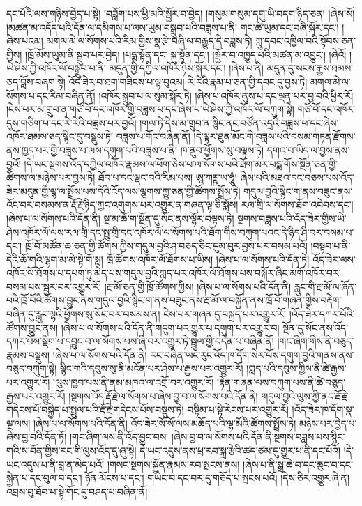 དང་པོའི་ལས་གཉིས་བྱེད་པ་སྟེ། །བཟློག་པས་ཕྱི་མའི་སྦྱོར་བ་བྱེད། །གསུམ་གསུམ་དགུ་ཡི་བདག་ཉིད་ཅན། །ཞེས་སོ། །མཚན་མ་འདོད་པའི་དོན་ལ་དམིགས་པ་ལས་ཡུམ་བསྒྲུབ་པའི་བཟླས་པ་ནི། གང་ཚེ་ཡུམ་དང་བཞི་སྐོར་དང་། །ཞེས་པའམ། མགལ་མེ་ལ་སོགས་པའི་རིམ་གྱིས་སྣ་རྩེ་བཞི་ལ་བརྒྱུད་དེ་བཟླས་ཏེ། ཀླུ་དབང་འཁྱིལ་བའི་སྟོབས་ཅན་གྱིས། །ཁྲོ་མོས་ཡུམ་ནི་སྒྲུབ་པར་བྱེད། །པདྨ་སྟོན་དང་​ སྐུ་སྟོན་དང་། །སྦྱོར་བ་འཁྱུད་པའི་མཚན་མ་འབྱུང་། །ཞེའོ། །ཡེ་ཤེས་ཀྱི་འཁོར་ལོ་བསྒྲུབ་པ་ནི། མདུན་གྱི་དཀྱིལ་འཁོར་ཉིས་སྐོར་དང་། །ཞེས་པ་ནི། མདུན་དུ་སངས་རྒྱས་ཐམས་ཅད་བློས་བཞག་སྟེ། འོད་ཟེར་བ་ཐག་གཟིངས་པ་ལྟ་བུའམ། རེ་རེའི་རྣམ་པ་ཅན་གྱི་དབང་དུ་བྱས་ཏེ། མགལ་མེ་ལ་སོགས་པ་དང་རིམ་བཞིན་ནོ། །འཁོར་སྒྲུབ་པ་ལ་སུམ་སྐོར་ཏེ། །ཞེས་པ་འཁོར་ནུས་པ་དང་ལྡན་པར་བྱ་བའི་ཕྱིར་རོ། །ངེས་པར་མ་གྲུབ་ན་གཙོ་བོ་དང་འཁོར་གྱི་བཟླས་པ་དང་ཞེས་པ་ཡེ་ཤེས་ཀྱི་འཁོར་ལོ་བཀུག་སྟེ། གཙོ་བོ་དང་འཁོར་དུས་གཅིག་པ་དང་རེ་རེའི་བཟླས་པར་བྱའོ། །གལ་ཏེ་དེས་མ་གྲུབ་ན་སྙིང་ནང་བཙོན་འདྲའི་བཟླས་པ་དང་ཞེས་འཁོར་ཐམས་ཅད་སྙིང་དུ་བསྡུས་ཏེ། བཟླས་པ་གོང་བཞིན་ནོ། །དེ་ལྟར་ཐུན་མོང་གི་བཟླས་པའི་བསམ་གཏན་རྫོགས་ནས་ཁྱད་པར་གྱི་བཟླས་པ་ལས་དགུག་པའི་བཟླས་པ་ནི། ཁ་ནུབ་ཕྱོགས་སུ་བལྟས་ཏེ། དགའ་བ་ཡིད་ལ་བྱས་ནས་བྱའོ། །དེ་ཡང་སྔགས་འོད་དཀྱིལ་འཁོར་རྣམས་ལ་ཕོག་ཅེས་པ་ལ་སོགས་པའི་ཐོག་མར་པདྨ་གོས་སྔོན་ཅན་གྱི་ཚོགས་ལ་མཉེས་པར་བྱས་ཏེ། ཐོབ་པ་དང་ལྡང་བའི་རིམ་པས། ཨཱ་ཀཪྵ་ཡ་ཧཱུཾ། ཞེས་པའི་མཐའ་དང་བཅས་པས་འོད་ཟེར་མདུན་གྱི་ལྷ་ལ་སྤྲོས་པས་དེའི་འོད་ལས་ལྕགས་ཀྱུ་ཅན་གྱི་ཚོགས་སྤྲོས་ཏེ། གདུལ་བྱའི་སྙིང་ག་ནས་བཟུང་ནས་འོང་བར་བསམས་ན་རྡོ་རྗེ་ཉིད་ཀྱང་འགུགས་པར་འགྱུར་ན་གཞན་ལྟ་ཅི་སྨོས། རལ་གྲི་ལ་སོགས་ཐོག་འབེབས་དང་། །ཞེས་པ་ལ་སོགས་པའི་དོན་ནི། སྔ་མ་ཆོ་ག་སྔོན་དུ་སོང་ནས་ལྷོར་བལྟས་ཏེ། སྔགས་བཟླས་པའི་འོད་ཟེར་གྱིས་ཡེ་ཤེས་འཁོར་ལོ་ལས་རལ་གྲི་དང་སྤུ་གྲི་དང་འཁོར་ལོ་ལ་སོགས་པའི་ཐོག་གིས་བཀུག་པའང་དེ་ཉིད་ཤི་བར་བསམ་པ་དང་། ཁྲོ་བོ་མཚོན་ཆ་ཅན་གྱི་ཚོགས་ཀྱིས་གདུལ་བྱའི་ཤ་བཅད་ཅིང་དུམ་བུར་བྱས་པར་བསམ་པའོ། །བསྟབ་པ་ནི་དེའི་ཆོ་གའི་ལྷག་མ་མེ་སྟེ་གོ་སླ། ཁྲོ་ཚོགས་འཁོར་ལོ་ཐོགས་པ་ཡིས། །ཞེས་པ་ལ་སོགས་པའི་དོན་ཏེ། འོད་ཟེར་ལས་འཁོར་ལོ་ཐོགས་པ་དཔག་ཏུ་མེད་པས་གདུལ་བྱའི་ཀླད་པར་​ འཁོར་ལོ་ཐོགས་པས་བསྐོར་ཞིང་མགོ་འཁོར་བར་བསམ་པས་སྦྱར་བར་འགྱུར་རོ། །རྔ་མོ་ཅན་གྱི་ཁྲོ་ཚོགས་ཀྱིས། །ཞེས་པ་ལ་སོགས་པའི་དོན་ནི། རླུང་གི་རྔ་མོ་ལ་ཞོན་པའི་ཁྲོ་བོའི་ཚོགས་བྱུང་ནས་གདུལ་བྱའི་སྙིང་ག་ནས་བཟུང་ནས་རྔ་མོ་ལ་བསྐྱོན་ནས་ཁྲོ་བོ་གཞན་གྱིས་བརྡེག་བཞིན་དུ་རླུང་ལྷའི་ཕྱོགས་སུ་སོང་བར་བསམས་ན། ངེས་པར་གཞན་དུ་བསྐྲད་པར་འགྱུར་རོ། །འོད་ཟེར་དཀར་པོའི་ཚོགས་བྱུང་ནས། །ཞེས་པ་ལ་སོགས་པའི་དོན་ནི་གདུག་པར་གྱུར་པ་དགུག་པར་འགྱུར་བ། སྔོན་དུ་སོང་ནས་འོད་དཀར་པོས་སྡིག་པ་དབྱུང་བ་ལ་སོགས་པས་ཞི་བར་འགྱུར་ཏེ་སྦྲུལ་གྱི་བདེན་པ་བཞིན་ནོ། །གང་ཞིག་གིས་ནི་བཅུད་རྣམས་བསྡུས། །ཞེས་པ་ལ་སོགས་པའི་དོན་ནི། རང་བཞིན་ཡང་རུང་འོད་ཁ་དོག་སེར་པོས་དགུག་བྱའི་གནས་ནས་བཅུད་བཀུག་སྟེ། སྙིང་གའི་དབུས་སུ་ནི་མངོན་པར་ཤེས་པ་རྒྱས་པར་འགྱུར་རོ། །ཀླད་པའི་དབུས་ཀྱིས་ནི་ཚེ་རྒྱས་པར་འགྱུར་རོ། །ལུས་ཁྱབ་པས་ནི་ནམ་མཁའ་ལ་འགྲོ་བར་འགྱུར་རོ། །རྟེན་གཞན་ལས་བཀུག་པས་ནི་ཚེ་བཅུད་རྒྱས་པར་འགྱུར་རོ། །སྔགས་འོད་རྡོ་རྗེ་ལ་སོགས་པ་ཞེས་བྱ་བ་ལ་སོགས་པའི་དོན་ནི། གདུལ་བྱའི་ལུས་ཀྱི་ནང་རྡོ་རྗེ་གདེངས་པོ་བསྐྱེད་པ་སྤྲུལ་པའི་རྡོ་རྗེ་གདེངས་པོས་བསྡུས་ཏེ། བསྟིམ་པ་སྟེ་རེངས་པར་འགྱུར་རོ། །འོད་ཟེར་ཁ་དོག་སྣ་ལྔ་ལས། །ཞེས་པ་ལ་སོགས་པའི་དོན་ནི། འོད་ཟེར་སོ་སོ་ལས་མཆོད་པའི་ལྷ་མོའི་ཚོགས་སྤྲོས་ཏེ། མཉེས་པར་བྱེད་པ་ཞེས་བྱ་བའི་དོན་ཏོ། །གང་ཞིག་ལས་ནི་འོད་བྱུང་བས། །ཞེས་བྱ་བ་ལ་སོགས་པའི་དོན་ནི་སྔགས་བཟླས་པས་སྙིང་གའི་ས་བོན་གྱིས་རང་གི་ལུས་འོད་དུ་ཞུ་སྟེ། དེ་ཡང་འདུས་ནས་ཕྲ་རབ་སྐྲ་རྩེའི་ཚད་ཙམ་དུ་གྱུར་པ་ནི་དང་པོའོ། །དེ་ཡང་འདུས་པ་ནི་བླ་ན་མེད་པའོ། །གསང་སྔགས་སྐྱོན་རྣམས་རབ་སྤངས་ནས། །ཞེས་པ་ནི་སྒྲ་ཆེ་བ་དང་ཆུང་བ་དང་སྐྱེན་པ་དང་བུལ་བ་དང་། ཉོན་མོངས་པ་དང་། གཡེང་བ་དང་བར་དུ་གཅོད་པ་སྤངས་པའོ། །དེས་ཅིར་འགྱུར་ཞེ་ན། འབྲས་བུ་ཐོབ་པ་སྟེ་གོང་དུ་བཤད་པ་བཞིན་ནོ། 